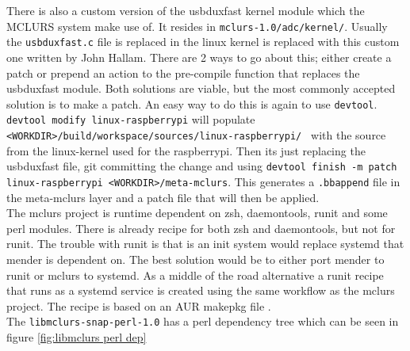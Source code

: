 \documentclass[../../main.tex]{subfiles}
\begin{document}
There is also a custom version of the usbduxfast kernel module which the MCLURS system
make use of. It resides in \texttt{mclurs-1.0/adc/kernel/}. Usually the
\texttt{usbduxfast.c} file is replaced in the linux kernel is replaced with this custom
one written by John Hallam.
There are 2 ways to go about this; either create a patch or prepend an action to the pre-compile
function that replaces the usbduxfast module.
Both solutions are viable, but the most commonly accepted solution is to make a patch.
An easy way to do this is again to use \texttt{devtool}.
\texttt{devtool modify linux-raspberrypi} will populate
\texttt{<WORKDIR>/build/workspace/sources/linux-raspberrypi/ }
with the source from the linux-kernel used for the raspberrypi.
Then its just replacing the usbduxfast file, git committing the change and
using \texttt{devtool finish -m patch linux-raspberrypi <WORKDIR>/meta-mclurs}.
This generates a \texttt{.bbappend} file in the meta-mclurs layer and a patch file
that will then be applied.\\

The mclurs project is runtime dependent on zsh, daemontools, runit and some perl modules.
There is already recipe for both zsh and daemontools, but not for runit.
The trouble with runit is that is an init system would replace systemd that mender is dependent on.
The best solution would be to either port mender to runit or mclurs to systemd.
As a middle of the road alternative a runit recipe that runs as a systemd service is created using
the same workflow as the mclurs project. The recipe is based on an AUR makepkg file
\cite{runit-systemd-aur}.\\

The \texttt{libmclurs-snap-perl-1.0} has a perl dependency tree which can be seen in
figure \ref{fig:libmclurs perl dep}
\end{document}
